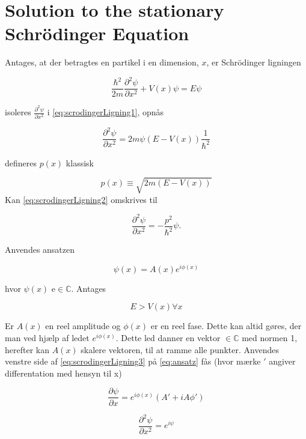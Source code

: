\section{Solution to the stationary Schrödinger Equation}

Antages, at der betragtes en partikel i en dimension, $x$,  er Schrödinger ligningen

\begin{equation}
    \frac{\hbar^2}{2m}\frac{\partial^2 \psi}{\partial x^2} + V(x) \psi = E \psi
    \label{eq:scrodingerLigning1}
\end{equation}

isoleres $\frac{\partial^2 \psi}{\partial x^2}$ i \cref{eq:scrodingerLigning1}, opnås

\begin{equation}
    \frac{\partial^2 \psi}{\partial x^2} = 2m\psi (E  - V(x)) \frac{1}{\hbar^2}
    \label{eq:scrodingerLigning2}
\end{equation}

defineres $p(x)$ klassisk

\begin{equation}
p(x) \equiv \sqrt{2m(E-V(x))}
\end{equation}
Kan \cref{eq:scrodingerLigning2} omskrives til

\begin{equation}
    \frac{\partial^2 \psi}{\partial x^2} = - \frac{p^2}{\hbar^2} \psi.
    \label{eq:scrodingerLigning3}
\end{equation}

Anvendes ansatzen

\begin{equation}
    \psi(x) = A(x) e^{i \phi(x)}
    \label{eq:ansatz}
\end{equation}

hvor $\psi (x)$ e$ \in \mathbb{C}$. Antages

\begin{equation}
 E > V(x) \forall x
\end{equation}

Er $A(x)$ en reel amplitude og $\phi(x)$ er en reel fase. Dette kan altid gøres, der man ved hjælp af ledet  $e^{i \phi(x)} $. Dette led danner en vektor $ \in \mathbb{C}$ med normen 1, herefter kan $A(x)$  skalere vektoren, til at ramme alle punkter. Anvendes venstre side af \cref{eq:scrodingerLigning3} på \cref{eq:ansatz} fås (hvor mærke $'$ angiver differentation med hensyn til x)

\begin{equation}
    \frac{\partial \psi}{\partial x} = e^{i \phi(x)}(A' + iA\phi ')
    \label{eq:diff1gange}
\end{equation}

\begin{equation}
    \frac{\partial^2 \psi}{\partial x^2} = e^{i \psi}
    \label{eq:diff2gange}
\end{equation}
